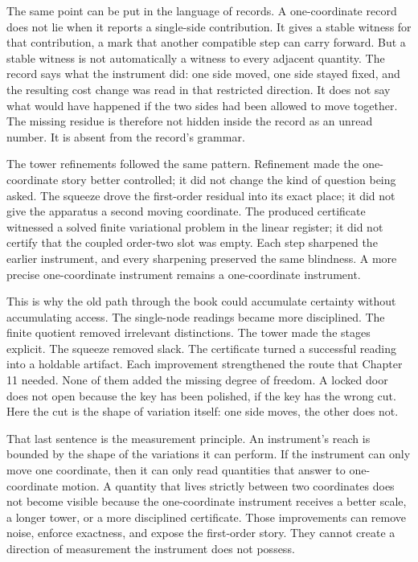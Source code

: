 The same point can be put in the language of records. A one-coordinate record
does not lie when it reports a single-side contribution. It gives a stable
witness for that contribution, a mark that another compatible step can carry
forward. But a stable witness is not automatically a witness to every adjacent
quantity. The record says what the instrument did: one side moved, one side
stayed fixed, and the resulting cost change was read in that restricted
direction. It does not say what would have happened if the two sides had been
allowed to move together. The missing residue is therefore not hidden inside
the record as an unread number. It is absent from the record's grammar.

The tower refinements followed the same pattern. Refinement made the
one-coordinate story better controlled; it did not change the kind of question
being asked. The squeeze drove the first-order residual into its exact place;
it did not give the apparatus a second moving coordinate. The produced
certificate witnessed a solved finite variational problem in the linear
register; it did not certify that the coupled order-two slot was empty. Each
step sharpened the earlier instrument, and every sharpening preserved the same
blindness. A more precise one-coordinate instrument remains a one-coordinate
instrument.

This is why the old path through the book could accumulate certainty without
accumulating access. The single-node readings became more disciplined. The
finite quotient removed irrelevant distinctions. The tower made the stages
explicit. The squeeze removed slack. The certificate turned a successful
reading into a holdable artifact. Each improvement strengthened the route that
Chapter 11 needed. None of them added the missing degree of freedom. A locked
door does not open because the key has been polished, if the key has the wrong
cut. Here the cut is the shape of variation itself: one side moves, the other
does not.

That last sentence is the measurement principle. An instrument's reach is
bounded by the shape of the variations it can perform. If the instrument can
only move one coordinate, then it can only read quantities that answer to
one-coordinate motion. A quantity that lives strictly between two coordinates
does not become visible because the one-coordinate instrument receives a better
scale, a longer tower, or a more disciplined certificate. Those improvements
can remove noise, enforce exactness, and expose the first-order story. They
cannot create a direction of measurement the instrument does not possess.

